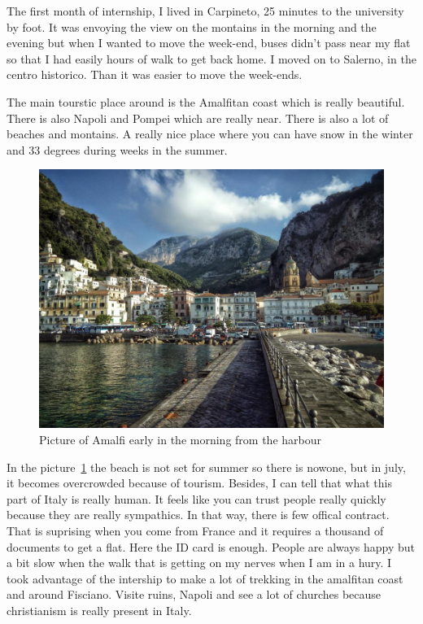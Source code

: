  \par The first month of internship, I lived in Carpineto, 25 minutes to the university by foot. It was envoying the view on the montains in the morning and the evening but when I wanted to move the week-end, buses didn't pass near my flat so that I had easily hours of walk to get back home. I moved on to Salerno, in the centro historico. Than it was easier to move the week-ends. 
 \par The main tourstic place around is the Amalfitan coast which is really beautiful. There is also Napoli and Pompei which are really near. There is also a lot of beaches and montains. A really nice place where you can have snow in the winter and 33 degrees during weeks in the summer. 
  \begin{figure}[h]
 \begin{center}
	 \includegraphics[width=12cm]{images_not_compressed/amalfi.jpg}
		\caption{Picture of Amalfi early in the morning from the harbour}
		\label{amalfi}
	 \end{center}
 \end{figure}

 \par In the picture~\ref{amalfi} the beach is not set for summer so there is nowone, but in july, it becomes overcrowded because of tourism. Besides, I can tell that what this part of Italy is really human. It feels like you can trust people really quickly because they are really sympathics. In that way, there is few offical contract. That is suprising when you come from France and it requires a thousand of documents to get a flat. Here the ID card is enough. People are always happy but a bit slow when the walk that is getting on my nerves when I am in a hury.
 I took advantage of the intership to make a lot of trekking in the amalfitan coast and around Fisciano. Visite ruins, Napoli and see a lot of churches because christianism is really present in Italy.